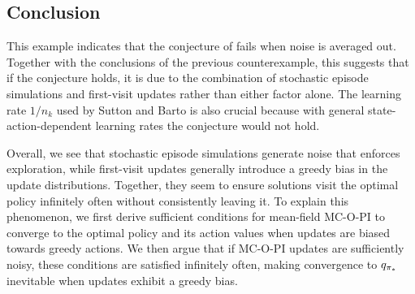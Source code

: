 

\subsection{Conclusion}

This example indicates that the conjecture of \citet[p.~99]{Sutton2018ReinforcementIntroduction} fails when noise is averaged out.
Together with the conclusions of the previous counterexample, this suggests that if the conjecture holds, it is due to the combination of stochastic episode simulations and first-visit updates rather than either factor alone.
The learning rate $1/n_k$ used by Sutton and Barto is also crucial
because with general state-action-dependent learning rates the conjecture would not hold.


Overall, we see that 
stochastic episode simulations generate noise that enforces exploration,
while first-visit updates generally introduce a greedy bias in the update distributions.
Together, they seem to ensure solutions visit the optimal policy infinitely often without consistently leaving it.
To explain this phenomenon, we first derive sufficient conditions for mean-field MC-O-PI to converge to the optimal policy and its action values when updates are biased towards greedy actions.
We then argue that if MC-O-PI updates are sufficiently noisy, these conditions are satisfied infinitely often, making convergence to $q_{{\pi}_*}$ inevitable when updates exhibit a greedy bias.




